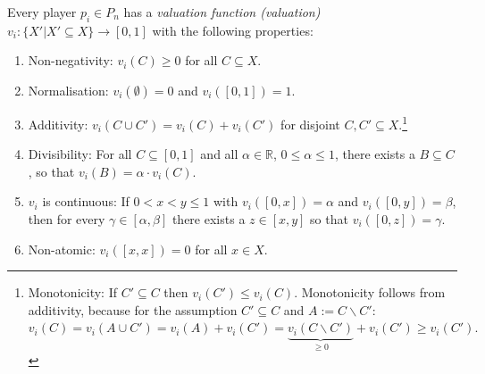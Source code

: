 Every player $p_i\in P_n$ has a \emph{valuation function (valuation)} $v_i:\{X'|X' \subseteq X\} \rightarrow [0,1]$ with the following properties:
\begin{enumerate}
\item Non-negativity: $v_i(C)\geq 0$ for all $C\subseteq X.$
\item Normalisation: $v_i(\emptyset)=0$ and $v_i([0,1])=1.$
\item Additivity: $v_i(C \cup C')=v_i(C)+v_i(C')$ for disjoint
$C,C'\subseteq X.$\footnote{Monotonicity: If $C' \subseteq C$ then $v_i(C') \leq v_i(C)$. Monotonicity follows from additivity, because for the assumption $C' \subseteq C$ and $A:=C\backslash C'$: $v_i(C)=v_i(A\cup C')=v_i(A)+v_i(C')=\underbrace{v_i(C\backslash C')}_{\geq 0}+v_i(C')\geq v_i(C').$}
\item Divisibility: For all $C\subseteq [0,1]$ and all $\alpha \in
\mathbb{R}$, $0\leq \alpha \leq 1$, there exists a $B\subseteq C$, so that
$v_i(B)=\alpha \cdot v_i(C).$
\item  $v_i$ is continuous: If $0<x<y\leq 1$ with $v_i([0,x])=\alpha$ and
$v_i([0,y])=\beta$, then for every $\gamma \in [\alpha,\beta]$ there exists a $z \in [x,y]$ so that $v_i([0,z])=\gamma.$
\item Non-atomic:  $v_i([x,x])=0$ for all $x\in X.$
\end{enumerate}
